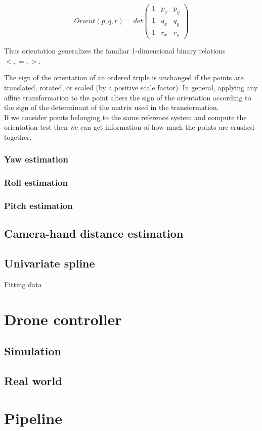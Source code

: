 \begin{Equation}[!htb]
	\centering
	\begin{equation}
	Orient(p,q,r) = det
	\begin{pmatrix}
	1 & p_x & p_y \\
	1 & q_x & q_y \\
	1 & r_x & r_y 
	\end{pmatrix}
	\end{equation}
	\caption[Orientation test.]{Thus orientation generalizes the familiar 1-dimensional binary relations $<, =, >$.}
	\label{eq:orientationtest}
\end{Equation}

\noindent The sign of the orientation of an ordered triple is unchanged if the points are translated, rotated, or scaled (by a positive scale factor). In general, applying any affine transformation to the point alters the sign of the orientation according to the sign of the determinant of the matrix used in the transformation. \\

\noindent If we consider points belonging to the same reference system and compute the orientation test then we can get information of how much the points are crushed together. 

\subsubsection{Yaw estimation}
\label{subsec:yaw}

\subsubsection{Roll estimation}
\label{subsec:roll}

\subsubsection{Pitch estimation}
\label{subsec:pitch}

\subsection{Camera-hand distance estimation}
\label{subsec:cam-hand}

\subsection{Univariate spline}
\label{sec:univspline}
Fitting data

\section{Drone controller}
\label{sec:dronecontrl}

\subsection{Simulation}
\label{sec:simulation}

\subsection{Real world}
\label{sec:simulation}

\section{Pipeline}
\label{sec:pipeline}
